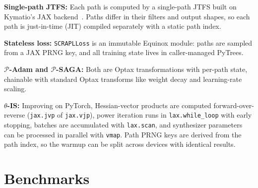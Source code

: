 \documentclass{article}
\begin{document}
\begin{sloppy}
\noindent \textbf{Single-path JTFS:} Each path is computed by a single-path JTFS built on Kymatio's JAX backend~\cite{andreux2020kymatio}.
Paths differ in their filters and output shapes, so each path is just-in-time (JIT) compiled separately with a static path index.

\noindent \textbf{Stateless loss:} \texttt{SCRAPLLoss} is an immutable Equinox module: paths are sampled from a JAX PRNG key, and all training state lives in caller-managed PyTrees.

\noindent \textbf{$\mathcal{P}$-Adam and $\mathcal{P}$-SAGA:} Both are Optax transformations with per-path state, chainable with standard Optax transforms like weight decay and learning-rate scaling.

\noindent \textbf{$\theta$-IS:} Improving on PyTorch, Hessian-vector products are computed forward-over-reverse (\texttt{jax.jvp} of \texttt{jax.vjp}), power iteration runs in \texttt{lax.while\_loop} with early stopping, batches are accumulated with \texttt{lax.scan}, and synthesizer parameters can be processed in parallel with \texttt{vmap}.
Path PRNG keys are derived from the path index, so the warmup can be split across devices with identical results.

\vspace{-8pt}
\section{Benchmarks}
\label{sec:bench}
\vspace{-5pt}



\end{sloppy}
\end{document}
